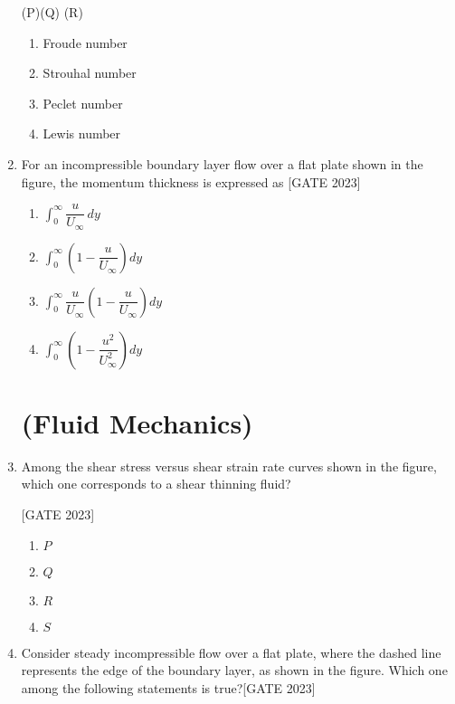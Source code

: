 \documentclass[journal,12pt,onecolumn]{IEEEtran}
\theoremstyle{remark}
\begin{document}
\begin{enumerate}
    
        
 \hspace{5cm}(P)\hspace{5cm}(Q)\hspace{5cm} (R)
    \begin{multicols}{2}
    \begin{enumerate}
        \item Froude number
        \item Strouhal number
        \item Peclet number
        \item Lewis number
    \end{enumerate}
    \end{multicols}

    \item For an incompressible boundary layer flow over a flat plate shown in the figure, the momentum thickness is expressed as
  \hfill{[GATE 2023]}
    \begin{multicols}{2}
    \begin{enumerate}
        \item $\int_0^{\infty} \dfrac{u}{U_\infty} \, dy$
        \item $\int_0^{\infty} \left( 1 - \dfrac{u}{U_\infty} \right) dy$
        \item $\int_0^{\infty} \dfrac{u}{U_\infty} \left( 1 - \dfrac{u}{U_\infty} \right) dy$
        \item $\int_0^{\infty} \left( 1 - \dfrac{u^2}{U_\infty^2} \right) dy$
    \end{enumerate}
    \end{multicols}
    \section*{(Fluid Mechanics)}
    \item Among the shear stress versus shear strain rate curves shown in the figure, which one corresponds to a shear thinning fluid?


\hfill{[GATE 2023]}
\begin{enumerate}
    \item $P$
    \item $Q$
    \item $R$
    \item $S$
\end{enumerate}


\item Consider steady incompressible flow over a flat plate, where the dashed line represents the edge of the boundary layer, as shown in the figure. Which one among the following statements is true?\hfill{[GATE 2023]}


\end{enumerate}
\end{document}
